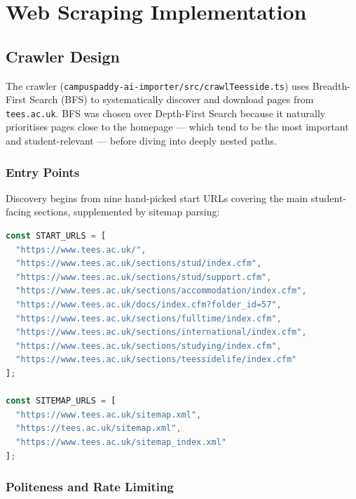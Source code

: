 \documentclass[12pt,a4paper]{report}
\begin{document}
\chapter{Web Scraping Implementation}

\section{Crawler Design}

The crawler (\texttt{campuspaddy-ai-importer/src/crawlTeesside.ts}) uses Breadth-First Search (BFS) to systematically discover and download pages from \texttt{tees.ac.uk}. BFS was chosen over Depth-First Search because it naturally prioritises pages close to the homepage --- which tend to be the most important and student-relevant --- before diving into deeply nested paths.

\subsection{Entry Points}

Discovery begins from nine hand-picked start URLs covering the main student-facing sections, supplemented by sitemap parsing:

\begin{lstlisting}[language=TypeScript, caption=Crawler start URLs and sitemap sources]
const START_URLS = [
  "https://www.tees.ac.uk/",
  "https://www.tees.ac.uk/sections/stud/index.cfm",
  "https://www.tees.ac.uk/sections/stud/support.cfm",
  "https://www.tees.ac.uk/sections/accommodation/index.cfm",
  "https://www.tees.ac.uk/docs/index.cfm?folder_id=57",
  "https://www.tees.ac.uk/sections/fulltime/index.cfm",
  "https://www.tees.ac.uk/sections/international/index.cfm",
  "https://www.tees.ac.uk/sections/studying/index.cfm",
  "https://www.tees.ac.uk/sections/teessidelife/index.cfm"
];

const SITEMAP_URLS = [
  "https://www.tees.ac.uk/sitemap.xml",
  "https://tees.ac.uk/sitemap.xml",
  "https://www.tees.ac.uk/sitemap_index.xml"
];
\end{lstlisting}

\subsection{Politeness and Rate Limiting}
\end{document}
